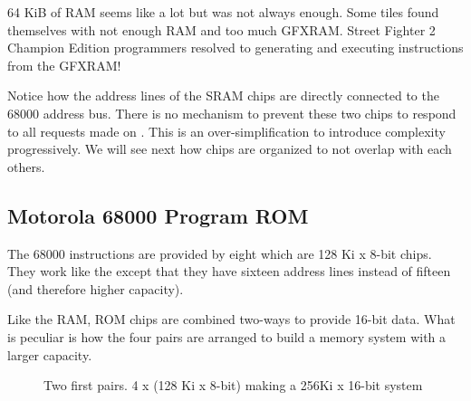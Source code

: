 
 \begin{trivia}
 64 KiB of RAM seems like a lot but was not always enough. Some tiles found themselves with not enough RAM and too much GFXRAM. Street Fighter 2 Champion Edition programmers resolved to generating and executing instructions from the GFXRAM\cite{mame_driver}!
 \end{trivia}

Notice how the address lines of the SRAM chips are directly connected to the 68000 address bus. There is no mechanism to prevent these two chips to respond to all requests made on \icode{[0x**0000-0x**7FFF]}. This is an over-simplification to introduce complexity progressively. We will see next how chips are organized to not overlap with each others.









\subsection{Motorola 68000 Program ROM}


The 68000 instructions are provided by eight  which are 128 Ki x 8-bit chips. They work like the  except that they have sixteen address lines instead of fifteen (and therefore higher capacity).

Like the RAM, ROM chips are combined two-ways to provide 16-bit data. What is peculiar is how the four pairs are arranged to build a memory system with a larger capacity.


\begin{figure}[H]
\caption*{Two first pairs. 4 x (128 Ki x 8-bit) making a 256Ki x 16-bit system}
\end{figure}

